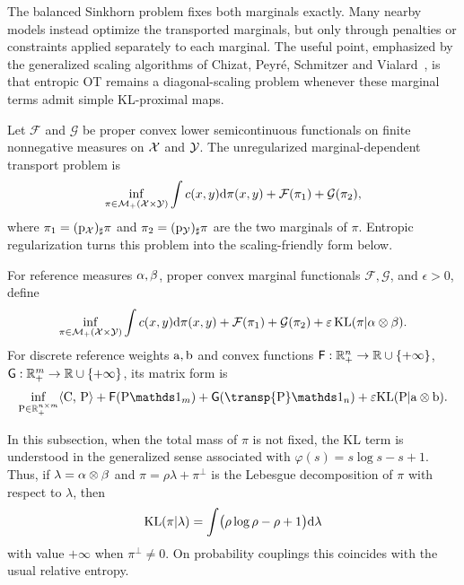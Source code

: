 The balanced Sinkhorn problem fixes both marginals exactly. Many nearby models instead optimize the transported marginals, but only through penalties or constraints applied separately to each marginal. The useful point, emphasized by the generalized scaling algorithms of Chizat, Peyr\'e, Schmitzer and Vialard~\cite{2016-chizat-sinkhorn}, is that entropic OT remains a diagonal-scaling problem whenever these marginal terms admit simple KL-proximal maps.

Let $\mathcal F$ and $\mathcal G$ be proper convex lower semicontinuous functionals on finite nonnegative measures on $\mathcal{X}$ and $\mathcal{Y}$. The unregularized marginal-dependent transport problem is
\begin{equation}\label{eq-marginal-dependent-unregularized-cont}
	\inf_{\pi\in\mathcal{M}_+(\mathcal{X}\times\mathcal{Y})}
	\int c(x,y)\mathrm{d}\pi(x,y)
	+
	\mathcal F(\pi_1)
	+
	\mathcal G(\pi_2),
\end{equation}
where $\pi_1=(\mathrm{p}_{\mathcal{X}})_\sharp\pi$ and $\pi_2=(\mathrm{p}_{\mathcal{Y}})_\sharp\pi$ are the two marginals of $\pi$. Entropic regularization turns this problem into the scaling-friendly form below.
\begin{defn}\label{def-marginal-dependent-entropic-transport}
For reference measures \(\alpha,\beta\), proper convex marginal functionals \(\mathcal F,\mathcal G\), and \(\epsilon>0\), define
\begin{equation}\label{eq-marginal-dependent-cont}
	\inf_{\pi\in\mathcal{M}_+(\mathcal{X}\times\mathcal{Y})}
	\int c(x,y)\mathrm{d}\pi(x,y)
	+
	\mathcal F(\pi_1)
	+
	\mathcal G(\pi_2)
	+
	\varepsilon\operatorname{KL}(\pi|\alpha\otimes\beta).
\end{equation}
For discrete reference weights \(\mathrm{a},\mathrm{b}\) and convex functions
\(\mathsf F:\mathbb{R}_+^n\to\mathbb{R}\cup\{+\infty\}\),
\(\mathsf G:\mathbb{R}_+^m\to\mathbb{R}\cup\{+\infty\}\), its matrix form is
\begin{equation}\label{eq-marginal-dependent-discrete}
	\inf_{\P\in\RR_+^{n\times m}}
	\dotp{\C}{\P}
	+
	\mathsf F(\P\ones_m)
	+
	\mathsf G(\transp{\P}\ones_n)
	+
	\epsilon\KLD(\P|\a\otimes\b).
\end{equation}
\end{defn}
In this subsection, when the total mass of $\pi$ is not fixed, the KL term is understood in the generalized sense associated with $\varphi(s)=s\log s-s+1$. Thus, if $\lambda=\alpha\otimes\beta$ and $\pi=\rho\lambda+\pi^\perp$ is the Lebesgue decomposition of $\pi$ with respect to $\lambda$, then
\[
	\operatorname{KL}(\pi|\lambda)
	=
	\int \bigl(\rho\log\rho-\rho+1\bigr)\mathrm{d}\lambda
\]
with value $+\infty$ when $\pi^\perp\ne0$. On probability couplings this coincides with the usual relative entropy.

